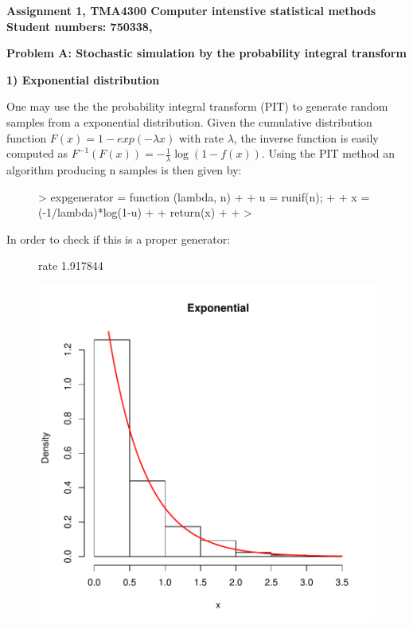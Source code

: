 \documentclass[12pt]{article}
\begin{document}


\sffamily \textbf{Assignment 1, TMA4300 Computer intenstive statistical methods}\\
{\sffamily \textbf{Student numbers: 750338, }}\\


{\sffamily \textbf{Problem A: Stochastic simulation by the probability integral transform}\\

{\sffamily \textbf{1) Exponential distribution}

One may use the the probability integral transform (PIT) to generate random samples from a exponential distribution. Given the cumulative distribution function
$F(x) = 1 - exp(-\lambda x)$ with rate $\lambda$, the inverse function is easily computed as $F^{-1}(F(x)) = -\frac{1}{\lambda}\log(1-f(x))$. Using
the PIT method an algorithm producing n samples is then given by:

\begin{figure}[H]
\centering
\begin{Schunk}
\begin{Sinput}
> expgenerator = function (lambda, n){
+ 
+   u = runif(n);
+ 
+   x = (-1/lambda)*log(1-u)
+ 
+ return(x)
+ 
+ }
> 
\end{Sinput}
\end{Schunk}
\end{figure}
In order to check if this is a proper generator:
\begin{figure}[H]
\centering
\begin{Schunk}
\begin{Soutput}
    rate 
1.917844 
\end{Soutput}
\end{Schunk}
\includegraphics{p1partC01v02-002}
\end{figure}

}}
\end{document}
